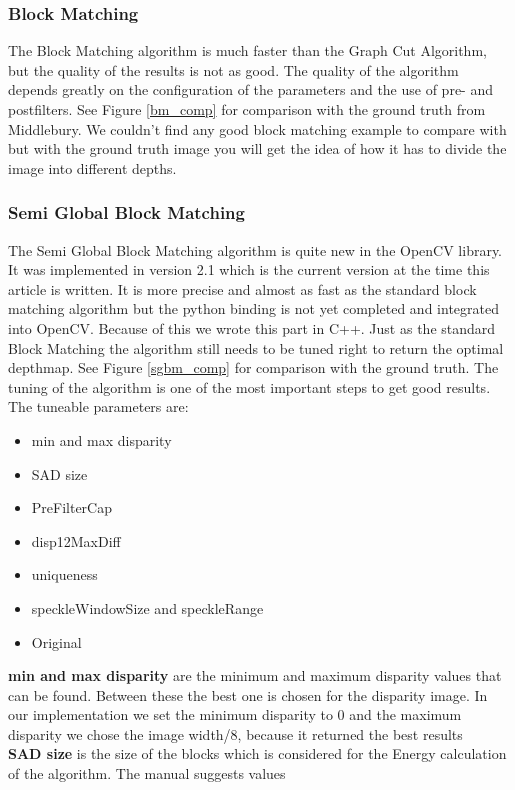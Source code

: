 \documentclass[a4paper]{article}
\begin{document}
\subsubsection{Block Matching} 
The Block Matching algorithm is much faster than the Graph Cut
Algorithm, but the quality of the results is not as good.  The quality
of the algorithm depends greatly on the configuration of the
parameters and the use of pre- and postfilters. See Figure
\ref{bm_comp} for comparison with the ground truth from Middlebury. We
couldn't find any good block matching example to compare with but with
the ground truth image you will get the idea of how it has to divide
the image into different depths.

\subsubsection{Semi Global Block Matching}
The Semi Global Block Matching algorithm is quite new in the OpenCV
library. It was implemented in version 2.1 which is the current
version at the time this article is written. It is more precise and
almost as fast as the standard block matching algorithm but the python
binding is not yet completed and integrated into OpenCV. Because of
this we wrote this part in C++. Just as the standard Block Matching
the algorithm still needs to be tuned right to return the optimal
depthmap. See Figure \ref{sgbm_comp} for comparison with the ground
truth. The tuning of the algorithm is one of the most important
steps to get good results. The tuneable parameters are: 
\begin{itemize}
\item min and max disparity
\item SAD size
\item PreFilterCap
\item disp12MaxDiff
\item uniqueness
\item speckleWindowSize and speckleRange
\item Original
\end{itemize}
\noindent\textbf{min and max disparity} are the minimum and maximum disparity
values that can be found. Between these the best one is chosen for the
disparity image. In our implementation we set the minimum disparity to
0 and the maximum disparity we chose the image width/8, because it
returned the best results\\
\textbf{SAD size} is the size of the blocks which is considered for the
Energy calculation of the algorithm. The manual suggests values
\end{document}
